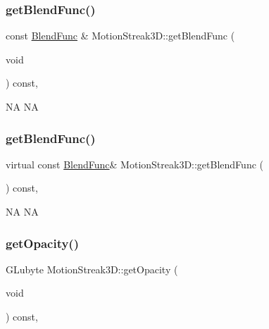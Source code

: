 \subsubsection{\texorpdfstring{get\+Blend\+Func()}{getBlendFunc()}\hspace{0.1cm}{\footnotesize\ttfamily [1/2]}}
{\footnotesize\ttfamily const \hyperlink{structBlendFunc}{Blend\+Func} \& Motion\+Streak3\+D\+::get\+Blend\+Func (\begin{DoxyParamCaption}\item[{void}]{ }\end{DoxyParamCaption}) const\hspace{0.3cm}{\ttfamily [override]}, {\ttfamily [virtual]}}

NA  NA \mbox{\label{classMotionStreak3D_a9d57c6213ec8145cd4e3ac9bb9c65ba0}} 
\subsubsection{\texorpdfstring{get\+Blend\+Func()}{getBlendFunc()}\hspace{0.1cm}{\footnotesize\ttfamily [2/2]}}
{\footnotesize\ttfamily virtual const \hyperlink{structBlendFunc}{Blend\+Func}\& Motion\+Streak3\+D\+::get\+Blend\+Func (\begin{DoxyParamCaption}{ }\end{DoxyParamCaption}) const\hspace{0.3cm}{\ttfamily [override]}, {\ttfamily [virtual]}}

NA  NA \mbox{\label{classMotionStreak3D_ad801e665463b5ed5b60a2d01468ddb89}} 
\subsubsection{\texorpdfstring{get\+Opacity()}{getOpacity()}\hspace{0.1cm}{\footnotesize\ttfamily [1/2]}}
{\footnotesize\ttfamily G\+Lubyte Motion\+Streak3\+D\+::get\+Opacity (\begin{DoxyParamCaption}\item[{void}]{ }\end{DoxyParamCaption}) const\hspace{0.3cm}{\ttfamily [override]}, {\ttfamily [virtual]}}

